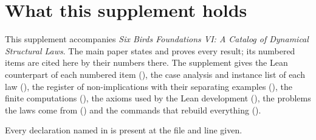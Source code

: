 \section{What this supplement holds}
\label{supp:about}

This supplement accompanies \emph{Six Birds Foundations VI: A Catalog of Dynamical Structural Laws}.
The main paper states and proves every result; its numbered items are cited here by their numbers
there. The supplement gives the Lean counterpart of each numbered item (),
the case analysis and instance list of each law (), the register of
non-implications with their separating examples (), the finite computations
(), the axioms used by the Lean development (), the problems the laws
come from () and the commands that rebuild everything ().

Every declaration named in  is present at the file and line
given.
